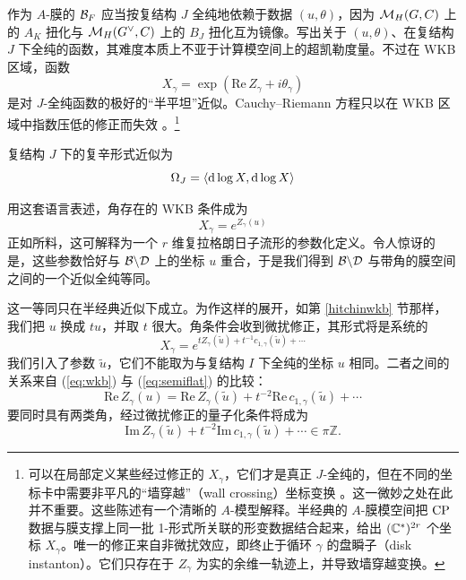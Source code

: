 作为 $A$-膜的 ${\mathcal B}_F$ 应当按复结构 $J$ 全纯地依赖于数据 $(u, \theta)$，因为 ${\mathcal M}_H(G,C)$ 上的 $A_K$ 扭化与 ${\mathcal M}_H(G^\vee,C)$ 上的 $B_J$ 扭化互为镜像。写出关于 $(u,\theta)$、在复结构 $J$ 下全纯的函数，其难度本质上不亚于计算模空间上的超凯勒度量。不过在 WKB 区域，函数
\begin{equation} \label{eq:semiflat}
X_\gamma = \exp \left(\mathrm{Re}\,Z_\gamma + i \theta_\gamma \right)
\end{equation}
 是对 $J$-全纯函数的极好的“半平坦”近似。Cauchy–Riemann 方程只以在 WKB 区域中指数压低的修正而失效 \cite{Gaiotto:2008cd}。\footnote{可以在局部定义某些经过修正的 $X_\gamma$，它们才是真正 $J$-全纯的，但在不同的坐标卡中需要非平凡的“墙穿越”（wall crossing）坐标变换 \cite{GMN}。这一微妙之处在此并不重要。这些陈述有一个清晰的 $A$-模型解释。半经典的 $A$-膜模空间把 ${\mathrm{CP}}$ 数据与膜支撑上同一批 1-形式所关联的形变数据结合起来，给出 $({\mathbb C}^*)^{2r}$ 个坐标 $X_\gamma$。唯一的修正来自非微扰效应，即终止于循环 $\gamma$ 的盘瞬子（disk instanton）。它们只存在于 $Z_\gamma$ 为实的余维一轨迹上，并导致墙穿越变换。}

复结构 $J$ 下的复辛形式近似为
\begin{equation}
\Omega_J = \langle {\mathrm d} \log X, {\mathrm d} \log X \rangle
\end{equation}

用这套语言表述，角存在的 WKB 条件成为
\begin{equation} \label{eq:wkb}
X_\gamma = e^{Z_\gamma(u)}
\end{equation}
 正如所料，这可解释为一个 $r$ 维复拉格朗日子流形的参数化定义。令人惊讶的是，这些参数恰好与 ${\cal B}\backslash{\cal D}$ 上的坐标 $u$ 重合，于是我们得到 ${\cal B}\backslash{\cal D}$ 与带角的膜空间之间的一个近似全纯等同。

这一等同只在半经典近似下成立。为作这样的展开，如第 \ref{hitchinwkb} 节那样，我们把 $u$ 换成 $tu$，并取 $t$ 很大。角条件会收到微扰修正，其形式将是系统的
 \begin{equation}
X_\gamma = e^{t Z_\gamma(\tilde u) + t^{-1} c_{1,\gamma}(\tilde u) + \cdots}
\end{equation}
我们引入了参数 $\tilde u$，它们不能取为与复结构 $I$ 下全纯的坐标 $u$ 相同。二者之间的关系来自 (\ref{eq:wkb}) 与 (\ref{eq:semiflat}) 的比较：
\begin{equation}
\mathrm{Re}\,Z_\gamma(u) = \mathrm{Re}\,Z_\gamma(\tilde u) + t^{-2} \mathrm{Re}\,c_{1,\gamma}(\tilde u) + \cdots
\end{equation}
要同时具有两类角，经过微扰修正的量子化条件将成为
\begin{equation}
\mathrm{Im}\,Z_\gamma(\tilde u) + t^{-2} \mathrm{Im}\,c_{1,\gamma}(\tilde u) + \cdots \in \pi \mathbb{Z}.
\end{equation}
 
